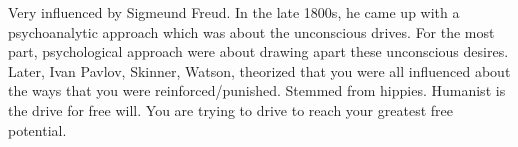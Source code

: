 \markdownRendererInterblockSeparator
{}\markdownRendererInterblockSeparator
{}\markdownRendererUlBeginTight
\markdownRendererUlItem Very influenced by Sigmeund Freud.\markdownRendererUlItemEnd 
\markdownRendererUlItem In the late 1800s, he came up with a psychoanalytic approach which was about the unconscious drives.\markdownRendererUlItemEnd 
\markdownRendererUlItem For the most part, psychological approach were about drawing apart these unconscious desires.\markdownRendererUlItemEnd 
\markdownRendererUlEndTight \markdownRendererInterblockSeparator
{}\markdownRendererInterblockSeparator
{}\markdownRendererUlBeginTight
\markdownRendererUlItem Later, Ivan Pavlov, Skinner, Watson, theorized that you were all influenced about the ways that you were reinforced/punished.\markdownRendererUlItemEnd 
\markdownRendererUlEndTight \markdownRendererInterblockSeparator
{}\markdownRendererInterblockSeparator
{}\markdownRendererUlBeginTight
\markdownRendererUlItem Stemmed from hippies.\markdownRendererUlItemEnd 
\markdownRendererUlItem Humanist is the drive for free will.\markdownRendererUlItemEnd 
\markdownRendererUlItem You are trying to drive to reach your greatest free potential.\markdownRendererUlItemEnd 
\markdownRendererUlEndTight \relax